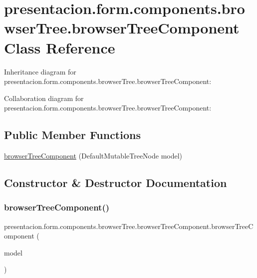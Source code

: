 \hypertarget{classpresentacion_1_1form_1_1components_1_1browserTree_1_1browserTreeComponent}{}\section{presentacion.\+form.\+components.\+browser\+Tree.\+browser\+Tree\+Component Class Reference}
\label{classpresentacion_1_1form_1_1components_1_1browserTree_1_1browserTreeComponent}


Inheritance diagram for presentacion.\+form.\+components.\+browser\+Tree.\+browser\+Tree\+Component\+:


Collaboration diagram for presentacion.\+form.\+components.\+browser\+Tree.\+browser\+Tree\+Component\+:
\subsection*{Public Member Functions}
\begin{DoxyCompactItemize}
\item 
\hyperlink{classpresentacion_1_1form_1_1components_1_1browserTree_1_1browserTreeComponent_aa7907916ddcbd3307207eacef3fa3456}{browser\+Tree\+Component} (Default\+Mutable\+Tree\+Node model)
\end{DoxyCompactItemize}


\subsection{Constructor \& Destructor Documentation}
\mbox{\label{classpresentacion_1_1form_1_1components_1_1browserTree_1_1browserTreeComponent_aa7907916ddcbd3307207eacef3fa3456}} 
\subsubsection{\texorpdfstring{browser\+Tree\+Component()}{browserTreeComponent()}}
{\footnotesize\ttfamily presentacion.\+form.\+components.\+browser\+Tree.\+browser\+Tree\+Component.\+browser\+Tree\+Component (\begin{DoxyParamCaption}\item[{Default\+Mutable\+Tree\+Node}]{model }\end{DoxyParamCaption})\hspace{0.3cm}{\ttfamily [inline]}}


